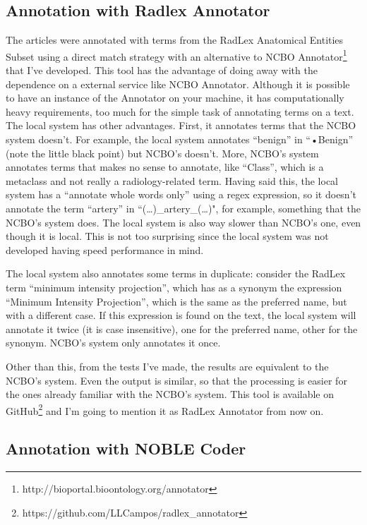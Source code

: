 \subsection{Annotation with Radlex Annotator}

The articles were annotated with terms from the RadLex Anatomical Entities Subset using a direct match strategy with an alternative to NCBO Annotator\footnote{http://bioportal.bioontology.org/annotator} that I've developed. This tool has the advantage of doing away with the dependence on a external service like NCBO Annotator. Although it is possible to have an instance of the Annotator on your machine, it has computationally heavy requirements, too much for the simple task of annotating terms on a text. The local system has other advantages. First, it annotates terms that the NCBO system doesn’t. For example, the local system annotates “benign” in “•Benign” (note the little black point) but NCBO's doesn’t. More, NCBO’s system annotates terms that makes no sense to annotate, like “Class”, which is a metaclass and not really a radiology-related term. Having said this, the local system has a “annotate whole words only” using a regex expression, so it doesn’t annotate the term “artery” in “(…)\_artery\_(…)", for example,  something that the NCBO’s system does. The local system is also way slower than NCBO's one, even though it is local. This is not too surprising since the local system was not developed having speed performance in mind. 

The local system also annotates some terms in duplicate: consider the RadLex term “minimum intensity projection”, which has as a synonym the expression “Minimum Intensity Projection”, which is the same as the preferred name, but with a different case. If this expression is found on the text, the local system will annotate it twice (it is case insensitive), one for the preferred name, other for the synonym. NCBO’s system only annotates it once. 

Other than this, from the tests I’ve made, the results are equivalent to the NCBO’s system. Even the output is similar, so that the processing is easier for the ones already familiar with the NCBO’s system. This tool is available on GitHub\footnote{https://github.com/LLCampos/radlex\_annotator} and I'm going to mention it as RadLex Annotator from now on.

\subsection{Annotation with NOBLE Coder}

